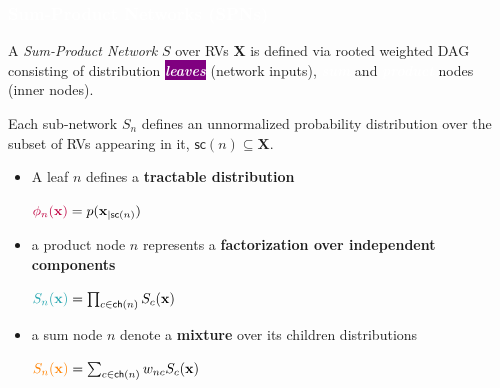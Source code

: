 \documentclass[xcolor={usenames,dvipsnames,svgnames}, compress]{beamer}
\newcommand{\highlight}[2][yellow]{\mathchoice%
  {\colorbox{#1}{\textcolor{white}{$\displaystyle{#2}$}}}%
  {\colorbox{#1}{\textcolor{white}{$\textstyle{#2}$}}}%
  {\colorbox{#1}{\textcolor{white}{$\scriptstyle{#2}$}}}%
  {\colorbox{#1}{\textcolor{white}{$\scriptscriptstyle{#2}$}}}}%
\newcommand{\highlighttext}[2][yellow]{{\colorbox{#1}{\textcolor{white}{#2}}}}
\begin{document}
  \begin{frame}[t]
    \frametitle{\highlighttext[tomato3]{Sum-Product Networks (SPNs)}}
    \footnotesize
      A \emph{Sum-Product Network} $S$ over RVs $\mathbf X$ is defined via
  rooted weighted DAG consisting of
  distribution \highlighttext[purple]{\emph{\textbf{leaves}}} (network inputs),  \highlighttext[gold2]{\emph{\textbf{sum}}} and \highlighttext[petroil2]{\emph{\textbf{product}}}
  nodes (inner nodes).

  \vspace{0.5 cm}

  Each sub-network $S_{n}$ defines an unnormalized probability
  distribution over the subset of RVs appearing in it, $\mathsf{sc}(n)\subseteq\mathbf X$.\par\bigskip
\begin{minipage}{0.63\textwidth}
\begin{itemize}
\item  A %
  leaf
  $n$ defines a \textbf{tractable distribution}\par
  \hfill ${\color{purple}\phi_{n}(\mathbf{x})}= p(\mathbf{x}_{|\mathsf{sc}(n)})$
\item a %
  product node
      $n$ represents a \textbf{factorization over independent
        components}\par
      \hfill${\color{petroil2}S_{n}(\mathbf{x})}=\prod_{c\in \mathsf{ch}(n)}S_{c}(\mathbf{x})$

  
\item a %
  sum node
    $n$  denote a
    \textbf{mixture} over its children distributions%
    \par
    \hfill ${\color{gold2}S_{n}(\mathbf{x})}=\sum_{c\in \mathsf{ch}(n)}w_{nc}S_{c}(\mathbf{x})$
\end{itemize}



\end{minipage}
\end{frame}
\end{document}

